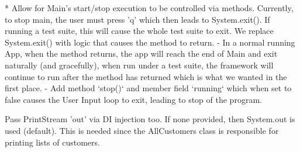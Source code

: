 
* Allow for Main's start/stop execution to be controlled via methods. Currently, to stop main, the user must press 'q' which then leads to System.exit(). If running a test suite, this will cause the whole test suite to exit. We replace System.exit() with logic that causes the method to return. 
 -	In a normal running App,   when the method returns, the app will reach the end of Main and exit naturally (and gracefully), when run under a test suite, the framework will continue to run after the method has returned which is what we wanted in the first place. 
  - Add method `stop()` and member field `running` which when set to false causes the User Input loop to exit, leading to stop of the program.





Pass PrintStream 'out' via DI injection too. If none provided, then System.out is used (default). This is needed since the AllCustomers class is responsible for printing lists of customers.  
